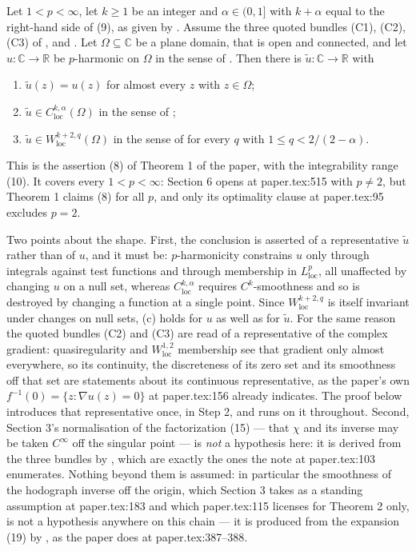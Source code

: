 \begin{theorem}
Let $1<p<\infty$, let $k\ge1$ be an integer and $\alpha\in(0,1]$ with
$k+\alpha$ equal to the right-hand side of (9), as given by
.  Assume the three quoted bundles (C1), (C2), (C3) of
,  and .
Let $\Omega\subseteq\mathbb{C}$ be a plane domain, that is open and connected,
and let $u\colon\mathbb{C}\to\mathbb{R}$ be $p$-harmonic on $\Omega$ in the
sense of .  Then there is
$\tilde u\colon\mathbb{C}\to\mathbb{R}$ with
\begin{enumerate}
\item[(a)] $\tilde u(z)=u(z)$ for almost every $z$ with $z\in\Omega$;
\item[(b)] $\tilde u\in C^{k,\alpha}_{\mathrm{loc}}(\Omega)$ in the sense of
  ;
\item[(c)] $\tilde u\in W^{k+2,q}_{\mathrm{loc}}(\Omega)$ in the sense of
   for every $q$ with $1\le q<2/(2-\alpha)$.
\end{enumerate}

This is the assertion (8) of Theorem 1 of the paper, with the integrability
range (10).  It covers every $1<p<\infty$: Section 6 opens at paper.tex:515
with $p\neq2$, but Theorem 1 claims (8) for all $p$, and only its optimality
clause at paper.tex:95 excludes $p=2$.

Two points about the shape.  First, the conclusion is asserted of a
representative $\tilde u$ rather than of $u$, and it must be: $p$-harmonicity
constrains $u$ only through integrals against test functions and through
membership in $L^{p}_{\mathrm{loc}}$, all unaffected by changing $u$ on a null
set, whereas $C^{k,\alpha}_{\mathrm{loc}}$ requires $C^{k}$-smoothness and so
is destroyed by changing a function at a single point.  Since
$W^{k+2,q}_{\mathrm{loc}}$ is itself invariant under changes on null sets, (c)
holds for $u$ as well as for $\tilde u$.  For the same reason the quoted
bundles (C2) and (C3) are read of a representative of the complex gradient:
quasiregularity and $W^{1,2}_{\mathrm{loc}}$ membership see that gradient only
almost everywhere, so its continuity, the discreteness of its zero set and its
smoothness off that set are statements about its continuous representative, as
the paper's own $f^{-1}(0)=\{z:\nabla u(z)=0\}$ at paper.tex:156 already
indicates.  The proof below introduces that representative once, in Step 2, and
runs on it throughout.  Second, Section 3's normalisation of
the factorization (15) --- that $\chi$ and its inverse may be taken $C^\infty$
off the singular point --- is \emph{not} a hypothesis here: it is derived from
the three bundles by , which are exactly the
ones the note at paper.tex:103 enumerates.  Nothing beyond them is assumed: in
particular the smoothness of the hodograph inverse off the origin, which
Section 3 takes as a standing assumption at paper.tex:183 and which
paper.tex:115 licenses for Theorem 2 only, is not a hypothesis anywhere on this
chain --- it is produced from the expansion (19) by , as the
paper does at paper.tex:387--388.
\end{theorem}
